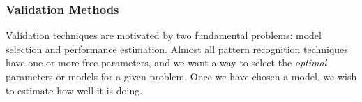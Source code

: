%

\subsubsection{Validation Methods}
Validation techniques are motivated by two fundamental problems: model
selection and performance estimation. Almost all pattern recognition techniques
have one or more free parameters, and we want a way to select the
\emph{optimal} parameters or models for a given problem. Once we have chosen a
model, we wish to estimate how well it is doing.

